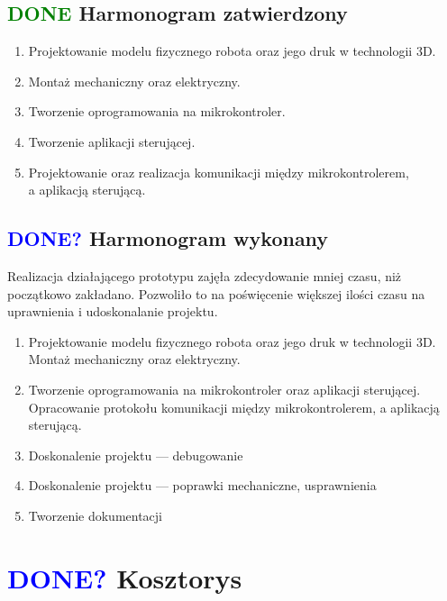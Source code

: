 \documentclass[11pt,titlepage,a4paper]{article}
\begin{document}
\subsection{\textcolor{green}{DONE} Harmonogram zatwierdzony}

\begin{enumerate}
    \item Projektowanie modelu fizycznego robota oraz jego druk w technologii 3D.
    \item Montaż mechaniczny oraz elektryczny.
    \item Tworzenie oprogramowania na mikrokontroler.
    \item Tworzenie aplikacji sterującej.
    \item Projektowanie oraz realizacja komunikacji między mikrokontrolerem, \\a aplikacją sterującą.
\end{enumerate}

\vspace*{2.5cm}

\subsection{\textcolor{blue}{DONE?} Harmonogram wykonany}

Realizacja działającego prototypu zajęła zdecydowanie mniej czasu, niż początkowo zakładano. Pozwoliło to na poświęcenie większej ilości czasu na uprawnienia i udoskonalanie projektu.

\begin{enumerate}
    \item Projektowanie modelu fizycznego robota oraz jego druk w technologii 3D. Montaż mechaniczny oraz elektryczny.
    \item Tworzenie oprogramowania na mikrokontroler oraz aplikacji sterującej. Opracowanie protokołu komunikacji między mikrokontrolerem, a aplikacją sterującą.
    \item Doskonalenie projektu — debugowanie
    \item Doskonalenie projektu — poprawki mechaniczne, usprawnienia
    \item Tworzenie dokumentacji
\end{enumerate}

\newpage

\section{\textcolor{blue}{DONE?} Kosztorys}
\end{document}
